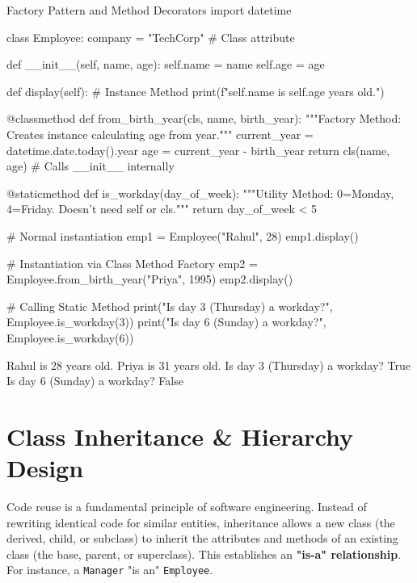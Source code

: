 \begin{pythoncode}{Factory Pattern and Method Decorators}
import datetime

class Employee:
    company = "TechCorp" # Class attribute
    
    def __init__(self, name, age):
        self.name = name
        self.age = age
        
    def display(self): # Instance Method
        print(f"{self.name} is {self.age} years old.")
        
    @classmethod
    def from_birth_year(cls, name, birth_year):
        """Factory Method: Creates instance calculating age from year."""
        current_year = datetime.date.today().year
        age = current_year - birth_year
        return cls(name, age) # Calls __init__ internally
        
    @staticmethod
    def is_workday(day_of_week):
        """Utility Method: 0=Monday, 4=Friday. Doesn't need self or cls."""
        return day_of_week < 5

# Normal instantiation
emp1 = Employee("Rahul", 28)
emp1.display()

# Instantiation via Class Method Factory
emp2 = Employee.from_birth_year("Priya", 1995)
emp2.display()

# Calling Static Method
print("Is day 3 (Thursday) a workday?", Employee.is_workday(3))
print("Is day 6 (Sunday) a workday?", Employee.is_workday(6))
\end{pythoncode}

\begin{outputbox}
Rahul is 28 years old.
Priya is 31 years old.
Is day 3 (Thursday) a workday? True
Is day 6 (Sunday) a workday? False
\end{outputbox}

\section{Class Inheritance \& Hierarchy Design}

Code reuse is a fundamental principle of software engineering. Instead of rewriting identical code for similar entities, inheritance allows a new class (the derived, child, or subclass) to inherit the attributes and methods of an existing class (the base, parent, or superclass). This establishes an \textbf{"is-a" relationship}. For instance, a \texttt{Manager} "is an" \texttt{Employee}.

